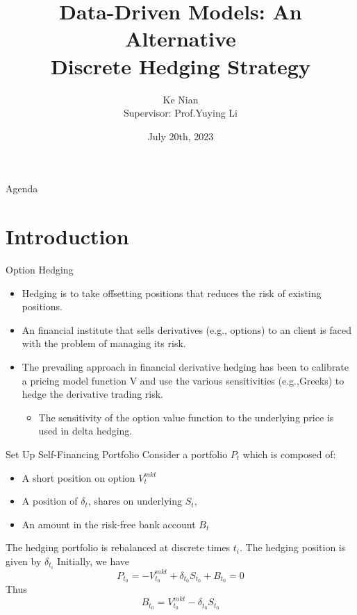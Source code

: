 \documentclass[10pt,table,mathserif]{beamer}
\title[Data-Driven Models: An Alternative
Discrete Hedging Strategy]%
{Data-Driven Models: An Alternative \\
Discrete Hedging Strategy}
\author[Ke Nian ] %
{ Ke Nian\\
 Supervisor: Prof.Yuying Li
}
\institute[
  David R. Cheriton School of Computer Science, University of Waterloo
] %
{%
  David R. Cheriton School of Computer Science,\\
  University of Waterloo,\\
  Waterloo, Canada
}
\date{July 20th, 2023}
\newcommand{\Vmkt}{V^{mkt}}
\newcommand{\Smkt}{S}
\begin{document}
\begin{frame}[plain] %
  \titlepage
\end{frame}

\begin{frame}{Agenda}{}
\tableofcontents
\end{frame}

\section{Introduction}
\begin{frame}{Option Hedging}
\begin{itemize}
\item Hedging is to take  offsetting positions that reduces the  risk of existing positions. 
\item An financial institute that sells derivatives (e.g., options) to an client is faced with the problem of managing its risk.  
\item The prevailing approach in financial derivative hedging has been to calibrate a pricing model function V and use the various sensitivities (e.g.,Greeks) to hedge the derivative trading risk. 
\begin{itemize}
	  \item The sensitivity of the option value function to the underlying price is used in delta hedging.
\end{itemize}
\end{itemize}
\end{frame}
\begin{frame}{Set Up Self-Financing Portfolio}
Consider a portfolio $P_{t}$ which is composed of:
\begin{itemize}
\item A short position on option $\Vmkt_{t}$
\item A position of $\delta_{t}$, shares on underlying $\Smkt_{t}$,
\item An amount in the risk-free bank account $B_t$
\end{itemize}
The hedging portfolio is rebalanced at discrete times $t_i$. The hedging position is given by $\delta_{t_i}$
Initially, we have
\[
P_{t_0}=  -\Vmkt_{t_0}+\delta_{t_0} \Smkt_{t_0}+ B_{t_0}=0
\]
Thus
\[
B_{t_0}=\Vmkt_{t_0}-\delta_{t_0} \Smkt_{t_0}
\]
\end{frame}
\end{document}
